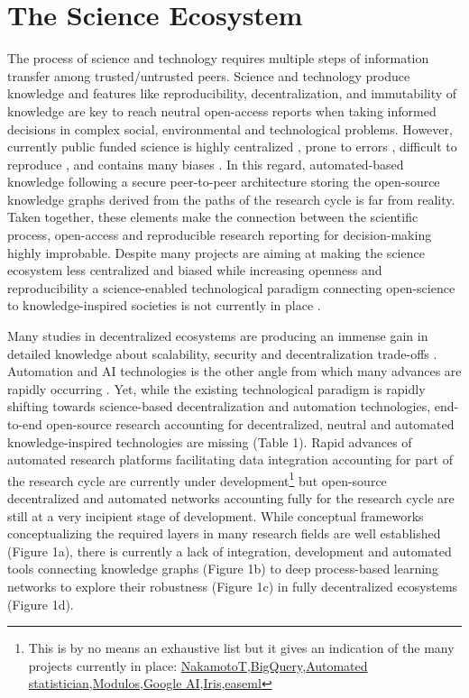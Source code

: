 \documentclass[10pt, a4paper, twocolumn]{article} %
\begin{document}
{\section{The Science Ecosystem}
The process of science and technology requires multiple steps of
information transfer among trusted/untrusted peers. Science and
technology produce knowledge and features like reproducibility,
decentralization, and immutability of knowledge are key to reach
neutral open-access reports when taking informed decisions in complex
social, environmental and technological problems. However, currently
public funded science is highly centralized
\citep{Inhaber1977,Gunther2018}⁠⁠, prone to errors \citep{Fang2011},
difficult to reproduce \citep{Hardwicke2018}, and contains many biases
\citep{Ioannidis2005}. In this regard, automated-based knowledge
following a secure peer-to-peer architecture storing the open-source
knowledge graphs derived from the paths of the research cycle is far
from reality. Taken together, these elements make the connection
between the scientific process, open-access and reproducible research
reporting for decision-making highly improbable. Despite many projects
are aiming at making the science ecosystem less centralized and biased
while increasing openness and reproducibility a science-enabled
technological paradigm connecting open-science to knowledge-inspired
societies is not currently in place \citep{Gunther2018}.

Many studies in decentralized ecosystems are producing an immense gain
in detailed knowledge about scalability, security and decentralization
trade-offs
\citep{Golem2016,Durov2017,Androulaki2018,OceanProtocolFoundation2018,BigchainDBGmbH2018}. Automation
and AI technologies is the other angle from which many advances are
rapidly occurring \citep{Schmidhuber:2015,Reichstein,Gil2019}. Yet,
while the existing technological paradigm is rapidly shifting towards
science-based decentralization and automation technologies, end-to-end
open-source research accounting for decentralized, neutral and
automated knowledge-inspired technologies are missing (Table 1). Rapid
advances of automated research platforms facilitating data integration
accounting for part of the research cycle are currently under
development\footnote{This is by no means an exhaustive list but it
  gives an indication of the many projects currently in place:
  \href{https://www.nterminal.com}{NakamotoT},\href{https://cloud.google.com/bigquery/}{BigQuery},\href{https://www.automaticstatistician.com/index/}{Automated
    statistician},\href{http://www.modulos.ai/}{Modulos},\href{https://ai.google/}{Google
    AI},\href{https://iris.ai}{Iris},\href{https://github.com/DS3Lab/easeml}{easeml}}
but open-source decentralized and automated networks accounting fully
for the research cycle are still at a very incipient stage of
development. While conceptual frameworks conceptualizing the required
layers in many research fields are well established (Figure 1a), there
is currently a lack of integration, development and automated tools
connecting knowledge graphs (Figure 1b) to deep process-based learning
networks to explore their robustness (Figure 1c) in fully
decentralized ecosystems (Figure 1d).

}
\end{document}
